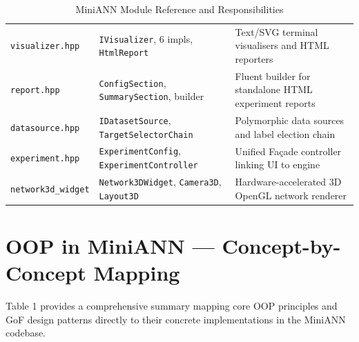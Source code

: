 \documentclass[11pt,a4paper]{article}
\begin{document}
\begin{table}[htbp]
\begin{tabularx}{\textwidth}{llX}
\texttt{visualizer.hpp} & \texttt{IVisualizer}, 6 impls, \texttt{HtmlReport} & Text/SVG terminal visualisers and HTML reporters \\
\texttt{report.hpp} & \texttt{ConfigSection}, \texttt{SummarySection}, builder & Fluent builder for standalone HTML experiment reports \\
\texttt{datasource.hpp} & \texttt{IDatasetSource}, \texttt{TargetSelectorChain} & Polymorphic data sources and label election chain \\
\texttt{experiment.hpp} & \texttt{ExperimentConfig}, \texttt{ExperimentController} & Unified Fa\c{c}ade controller linking UI to engine \\
\texttt{network3d\_widget} & \texttt{Network3DWidget}, \texttt{Camera3D}, \texttt{Layout3D} & Hardware-accelerated 3D OpenGL network renderer \\
\bottomrule
\end{tabularx}
\caption{MiniANN Module Reference and Responsibilities}
\end{table}

\section{OOP in MiniANN --- Concept-by-Concept Mapping}

Table 1 provides a comprehensive summary mapping core OOP principles and GoF design patterns directly to their concrete implementations in the MiniANN codebase.
\end{document}
